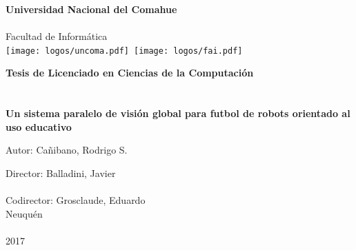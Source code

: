 
\titlepage

\begin{center}
\ \\
\ \\
\vspace{-1cm}


\ \\

\vspace{0.5cm}
{\Large{\bf \sc Universidad Nacional del Comahue}}\\

\ \\
{\Large { \sc Facultad de Informática}}\\

\vspace{-2.5cm}
\mbox{\hspace{-1cm}\texttt{[image: logos/uncoma.pdf]}\hspace{13cm} \texttt{[image: logos/fai.pdf]}}


\vspace{6cm}

{\Large {\bf\sc Tesis de Licenciado en Ciencias de la Computación}}\\
\ \\
\ \\
{\LARGE {\bf Un sistema paralelo de visión global para futbol de robots
	orientado al uso educativo}}\\
\vspace{3cm}

{\Large Autor: Cañibano, Rodrigo S.}\\
\vspace{2cm}

{\Large Director: Balladini, Javier}\\
\ \\
{\Large Codirector: Grosclaude, Eduardo}\\

\vfill
{\Large {\sc Neuquén}\hspace{6cm}{\sc Argentina}}\\
\ \\

{\Large 2017}\\

\end{center}

\pagebreak

